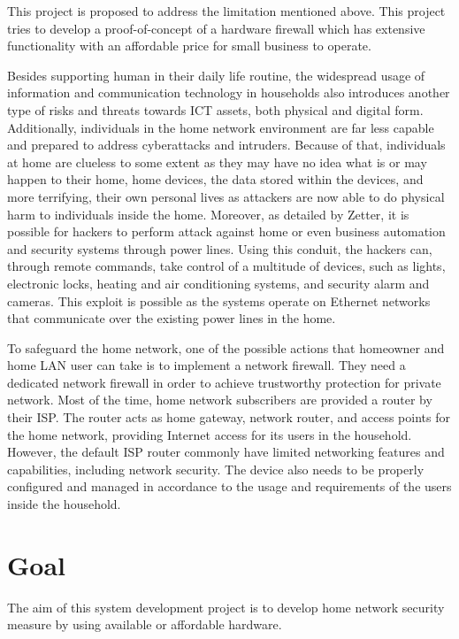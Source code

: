 \documentclass[../index.tex]{subfiles}
\begin{document}
This project is proposed to address the limitation mentioned above. This project tries to develop a proof-of-concept of a hardware firewall which has extensive functionality with an affordable price for small business to operate.

Besides supporting human in their daily life routine, the widespread usage of information and communication technology in households also introduces another type of risks and threats towards ICT assets, both physical and digital form. Additionally, individuals in the home network environment are far less capable and prepared to address cyberattacks and intruders. Because of that, individuals at home are clueless to some extent as they may have no idea what is or may happen to their home, home devices, the data stored within the devices, and more terrifying, their own personal lives as attackers are now able to do physical harm to individuals inside the home. Moreover, as detailed by Zetter, it is possible for hackers to perform attack against home or even business automation and security systems through power lines. Using this conduit, the hackers can, through remote commands, take control of a multitude of devices, such as lights, electronic locks, heating and air conditioning systems, and security alarm and cameras. This exploit is possible as the systems operate on Ethernet networks that communicate over the existing power lines in the home.

To safeguard the home network, one of the possible actions that homeowner and home LAN user can take is to implement a network firewall. They need a dedicated network firewall in order to achieve trustworthy protection for private network. Most of the time, home network subscribers are provided a router by their ISP. The router acts as home gateway, network router, and access points for the home network, providing Internet access for its users in the household. However, the default ISP router commonly have limited networking features and capabilities, including network security. The device also needs to be properly configured and managed in accordance to the usage and requirements of the users inside the household.

\section{Goal}

The aim of this system development project is to develop home network security measure by using available or affordable hardware.
\end{document}
